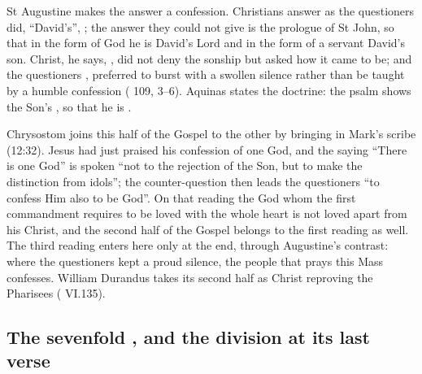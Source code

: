St Augustine makes the answer a confession. Christians answer as the
questioners did, ``David's'', ; the
answer they could not give is the prologue of St John, so that in the form of
God he is David's Lord and in the form of a servant David's son. Christ, he
says, ,
did not deny the sonship but asked how it came to be; and the questioners
, preferred to burst with a swollen silence rather than be taught by a
humble confession ( 109, 3--6). Aquinas states
the doctrine: the psalm shows the Son's , so that he is
.

Chrysostom joins this half of the Gospel to the other by bringing in Mark's
scribe (12:32). Jesus had just praised his confession of one God, and the saying ``There is
one God'' is spoken ``not to the rejection of the Son, but to make the
distinction from idols''; the counter-question then leads the questioners ``to
confess Him also to be God''. On that reading the God whom the first
commandment requires to be loved with the whole heart is not loved apart from
his Christ, and the second half of the Gospel belongs to the first reading as well. The third reading enters here only at the end, through Augustine's contrast: where the
questioners kept a proud silence, the people that prays this Mass confesses.
William Durandus takes its second half as Christ reproving the Pharisees
 (
VI.135).

\subsection{The sevenfold , and the division at its last verse}

